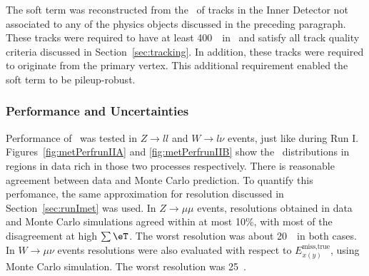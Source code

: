 \par The soft term was reconstructed from the \pt\ of tracks in the Inner Detector not associated to any of the 
physics objects discussed in the preceding paragraph. These tracks were required to have at least 
400~\MeV\ in \pt\ and satisfy all track quality criteria discussed in Section~\ref{sec:tracking}.   
In addition, these tracks were required to originate from the primary vertex. This additional requirement 
enabled the soft term to be pileup-robust. 

\subsubsection{Performance and Uncertainties}
\par Performance of \met\ was tested in $Z\to ll$ and $W\to l\nu$ events, just like during 
Run I. Figures~\ref{fig:metPerfrunIIA} and  \ref{fig:metPerfrunIIB} show the \met\ distributions 
in regions in data rich in those two processes respectively. There is reasonable agreement 
between data and Monte Carlo prediction. To quantify this perfomance, the same approximation 
for resolution discussed in Section~\ref{sec:runImet} was used. In $Z\to\mu\mu$ events, resolutions 
obtained in data and Monte Carlo simulations agreed within at most 10\%, with most of the disagreement 
at high $\sum\eT$. The worst resolution was about 20~\GeV\ in both cases. In $W\to \mu\nu$ events   
resolutions were also evaluated with respect to $E^{\text{miss,true}}_{x(y)}$, using Monte Carlo 
simulation. The worst resolution was 25~\GeV.

